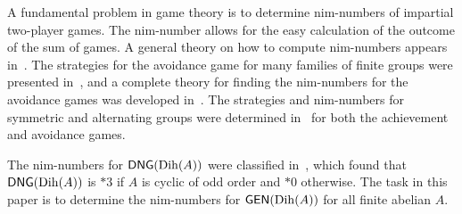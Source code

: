 \documentclass[12pt]{amsart}
\theoremstyle{definition}
\theoremstyle{definition}
\numberwithin{equation}{section}
\begin{document}
A fundamental problem in game theory is to determine nim-numbers of impartial two-player games. 
The nim-number allows for the easy calculation of the outcome of the sum of games. A general theory on how to compute nim-numbers appears in~\cite{ErnstSieben}.  
The strategies for the avoidance game for many families of finite groups were presented in~\cite{Barnes}, and a complete theory for finding the nim-numbers for the avoidance games was developed in~\cite{BeneshErnstSiebenDNG}.   
The strategies and nim-numbers for symmetric and alternating groups were determined in~\cite{BeneshErnstSiebenSymAlt} for both the achievement and avoidance games. 

The nim-numbers for ${\text{\sf DNG}}({\operatorname{Dih}}(A))$ were classified in~\cite{BeneshErnstSiebenDNG}, which found that ${\text{\sf DNG}}({\operatorname{Dih}}(A))$ is $*3$ if $A$ is cyclic of odd order and $*0$ otherwise.  
The task in this paper is to determine the nim-numbers for ${\text{\sf GEN}}({\operatorname{Dih}}(A))$ for all finite abelian $A$.
\end{document}

